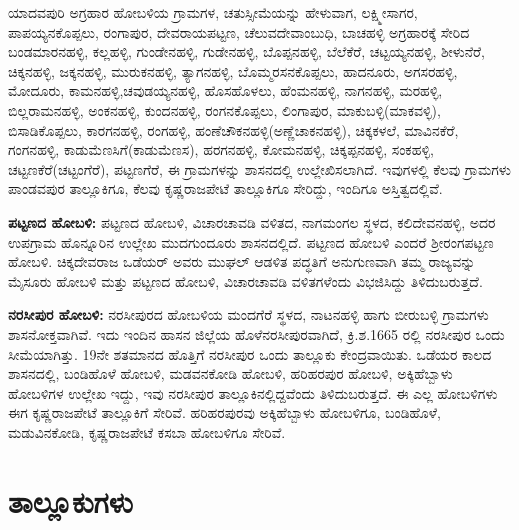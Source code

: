 ಯಾದವಪುರಿ ಅಗ್ರಹಾರ ಹೋಬಳಿಯ ಗ್ರಾಮಗಳ, ಚತುಸ್ಸೀಮೆಯನ್ನು ಹೇಳುವಾಗ, ಲಕ್ಷ್ಮೀಸಾಗರ, ಪಾಪಯ್ಯನ\-ಕೊಪ್ಪಲು, ರಂಗಾಪುರ, ದೇವರಾಯಪಟ್ಟಣ, ಚೆಲುವದೇವಾಂಬುಧಿ, ಬಾಚಹಳ್ಳಿ ಅಗ್ರಹಾರಕ್ಕೆ ಸೇರಿದ ಬಂಡಮಾರನಹಳ್ಳಿ, ಕಲ್ಲಹಳ್ಳಿ, ಗುಂಡೇನಹಳ್ಳಿ, ಗುಡೇನಹಳ್ಳಿ, ಬೊಪ್ಪನಹಳ್ಳಿ, ಬೆಲೆಕೆರೆ, ಚಟ್ಟಯ್ಯನಹಳ್ಳಿ, ಶೀಳುನೆರೆ, ಚಿಕ್ಕನಹಳ್ಳಿ, ಜಕ್ಕನಹಳ್ಳಿ, ಮುರುಕನಹಳ್ಳಿ, ತ್ಯಾಗನಹಳ್ಳಿ, ಬೊಮ್ಮರಸನಕೊಪ್ಪಲು, ಹಾದನೂರು, ಅಗಸರಹಳ್ಳಿ, ಮೋದೂರು, ಕಾಮನಹಳ್ಳಿ,\break ಚವುಡಯ್ಯನಹಳ್ಳಿ, ಹೊಸಹೊಳಲು, ಹೆಂಮನಹಳ್ಳಿ, ನಾಗನಹಳ್ಳಿ, ಮರಹಳ್ಳಿ, ಬಿಲ್ಲರಾಮನಹಳ್ಳಿ, ಅಂಕನಹಳ್ಳಿ, ಕುಂದನಹಳ್ಳಿ, ರಂಗನಕೊಪ್ಪಲು, ಲಿಂಗಾಪುರ, ಮಾಕುಬಳ್ಳಿ(ಮಾಕವಳ್ಳಿ), ಬಿಸಾಡಿಕೊಪ್ಪಲು, ಕಾರಗನಹಳ್ಳಿ, ರಂಗಹಳ್ಳಿ, ಹಂಣೆಚೌಕನ\-ಹಳ್ಳಿ\break (ಅಣ್ಣೆಚಾಕನಹಳ್ಳಿ), ಚಿಕ್ಕಕಳಲೆ, ಮಾವಿನಕೆರೆ, ಗಂಗನಹಳ್ಳಿ, ಕಾಡುಮೆಣಸಿಗೆ(ಕಾಡುಮೆಣಸ), ಹರಗನಹಳ್ಳಿ, ಕೋಮನಹಳ್ಳಿ, ಚಿಕ್ಕಪ್ಪನಹಳ್ಳಿ, ಸಂಕಹಳ್ಳಿ, ಚಟ್ಟಣಕೆರೆ(ಚಟ್ಟಂಗೆರೆ), ಪಟ್ಟಣಗೆರೆ, ಈ ಗ್ರಾಮಗಳನ್ನು ಶಾಸನದಲ್ಲಿ ಉಲ್ಲೇಖಿಸಲಾಗಿದೆ. ಇವುಗಳಲ್ಲಿ ಕೆಲವು ಗ್ರಾಮಗಳು ಪಾಂಡವಪುರ ತಾಲ್ಲೂಕಿಗೂ, ಕೆಲವು ಕೃಷ್ಣರಾಜಪೇಟೆ ತಾಲ್ಲೂಕಿಗೂ ಸೇರಿದ್ದು, ಇಂದಿಗೂ ಅಸ್ತಿತ್ವದಲ್ಲಿವೆ.

\textbf{ಪಟ್ಟಣದ ಹೋಬಳಿ:} ಪಟ್ಟಣದ ಹೋಬಳಿ, ವಿಚಾರಚಾವಡಿ ವಳಿತದ, ನಾಗಮಂಗಲ ಸ್ಥಳದ, ಕಲಿದೇವನಹಳ್ಳಿ, ಅದರ ಉಪಗ್ರಾಮ ಹೊನ್ನೂರಿನ ಉಲ್ಲೇಖ ಮುದಗುಂದೂರು ಶಾಸನದಲ್ಲಿದೆ. ಪಟ್ಟಣದ ಹೋಬಳಿ ಎಂದರೆ ಶ‍್ರೀರಂಗಪಟ್ಟಣ ಹೋಬಳಿ. ಚಿಕ್ಕದೇವರಾಜ ಒಡೆಯರ್​ ಅವರು ಮುಘಲ್​ ಆಡಳಿತ ಪದ್ಧತಿಗೆ ಅನುಗುಣವಾಗಿ ತಮ್ಮ ರಾಜ್ಯವನ್ನು ಮೈಸೂರು ಹೋಬಳಿ ಮತ್ತು ಪಟ್ಟಣದ ಹೋಬಳಿ, ವಿಚಾರಚಾವಡಿ ವಳಿತಗಳೆಂದು ವಿಭಜಿಸಿದ್ದು ತಿಳಿದುಬರುತ್ತದೆ.

\textbf{ನರಸೀಪುರ ಹೋಬಳಿ:} ನರಸೀಪುರದ ಹೋಬಳಿಯ ಮಂದಗೆರೆ ಸ್ಥಳದ, ನಾಟನಹಳ್ಳಿ ಹಾಗು ಬೀರುಬಳ್ಳಿ ಗ್ರಾಮಗಳು ಶಾಸನೋಕ್ತವಾಗಿವೆ. ಇದು ಇಂದಿನ ಹಾಸನ ಜಿಲ್ಲೆಯ ಹೊಳೆನರಸೀಪುರವಾಗಿದೆ, ಕ್ರಿ.ಶ.1665 ರಲ್ಲಿ ನರಸೀಪುರ ಒಂದು ಸೀಮೆಯಾಗಿತ್ತು. 19ನೇ ಶತಮಾನದ ಹೊತ್ತಿಗೆ ನರಸೀಪುರ ಒಂದು ತಾಲ್ಲೂಕು ಕೇಂದ್ರವಾಯಿತು. ಒಡೆಯರ ಕಾಲದ ಶಾಸನದಲ್ಲಿ, ಬಂಡಿಹೊಳೆ ಹೋಬಳಿ, ಮಡವನಕೋಡಿ ಹೋಬಳಿ, ಹರಿಹರಪುರ ಹೋಬಳಿ, ಅಕ್ಕಿಹೆಬ್ಬಾಳು ಹೋಬಳಿಗಳ ಉಲ್ಲೇಖ ಇದ್ದು, ಇವು ನರಸೀಪುರ ತಾಲ್ಲೂಕಿನಲ್ಲಿದ್ದವೆಂದು ತಿಳಿದುಬರುತ್ತದೆ. ಈ ಎಲ್ಲ ಹೋಬಳಿಗಳು ಈಗ ಕೃಷ್ಣರಾಜಪೇಟೆ ತಾಲ್ಲೂಕಿಗೆ ಸೇರಿವೆ. ಹರಿಹರಪುರವು ಅಕ್ಕಿಹೆಬ್ಬಾಳು ಹೋಬಳಿಗೂ, ಬಂಡಿಹೊಳೆ, ಮಡುವಿನಕೋಡಿ, ಕೃಷ್ಣರಾಜಪೇಟೆ ಕಸಬಾ ಹೋಬಳಿಗೂ ಸೇರಿವೆ.

\section{ತಾಲ್ಲೂಕುಗಳು}

